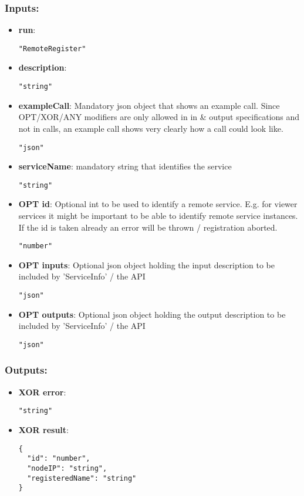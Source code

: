 \subsubsection*{Inputs:}
\begin{itemize}
    \item \textbf{run}: 
\begin{lstlisting}
"RemoteRegister"
\end{lstlisting}
    \item \textbf{description}: 
\begin{lstlisting}
"string"
\end{lstlisting}
    \item \textbf{exampleCall}: Mandatory json object that shows an example call. Since OPT/XOR/ANY  modifiers are only allowed in in \& output specifications and not in  calls, an example call shows very clearly how a call could look like.
\begin{lstlisting}
"json"
\end{lstlisting}
    \item \textbf{serviceName}: mandatory string that identifies the service
\begin{lstlisting}
"string"
\end{lstlisting}
    \item \textbf{OPT id}: Optional int to be used to identify a remote service. E.g. for  viewer services it might be important to be able to identify remote  service instances. If the id is taken already an error will be thrown /  registration aborted.
\begin{lstlisting}
"number"
\end{lstlisting}
    \item \textbf{OPT inputs}: Optional json object holding the input description to be included by 'ServiceInfo' / the API
\begin{lstlisting}
"json"
\end{lstlisting}
    \item \textbf{OPT outputs}: Optional json object holding the output description to be included by 'ServiceInfo' / the API
\begin{lstlisting}
"json"
\end{lstlisting}
  \end{itemize}

\subsubsection*{Outputs:}
\begin{itemize}
    \item \textbf{XOR error}: 
\begin{lstlisting}
"string"
\end{lstlisting}
    \item \textbf{XOR result}: 
\begin{lstlisting}
{
  "id": "number", 
  "nodeIP": "string", 
  "registeredName": "string"
}
\end{lstlisting}
  \end{itemize}

